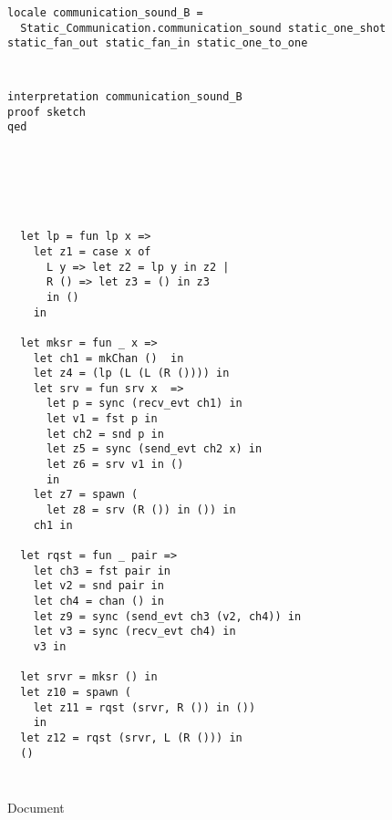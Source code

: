 \begin{lstlisting}[style=codestyle1, escapechar=\%]
locale communication_sound_B =
  Static_Communication.communication_sound static_one_shot static_fan_out static_fan_in static_one_to_one
    \end{lstlisting}

\begin{lstlisting}[style=codestyle1, escapechar=\%]

  \end{lstlisting}


\begin{lstlisting}[style=codestyle1, escapechar=\%]
  \end{lstlisting}


\begin{lstlisting}[style=codestyle1, escapechar=\%]
interpretation communication_sound_B
proof sketch
qed
  \end{lstlisting}


\begin{lstlisting}[style=codestyle1, escapechar=\%]
  \end{lstlisting}


\begin{lstlisting}[style=codestyle1, escapechar=\%]
  \end{lstlisting}


\begin{lstlisting}[style=codestyle1, escapechar=\%]
  \end{lstlisting}


\begin{lstlisting}[style=codestyle1, escapechar=\%]

  \end{lstlisting}


\begin{lstlisting}[style=codestyle1, escapechar=\%]


  let lp = fun lp x => 
    let z1 = case x of 
      L y => let z2 = lp y in z2 |
      R () => let z3 = () in z3
      in ()
    in

  let mksr = fun _ x => 
    let ch1 = mkChan ()  in
    let z4 = (lp (L (L (R ()))) in
    let srv = fun srv x  =>
      let p = sync (recv_evt ch1) in
      let v1 = fst p in
      let ch2 = snd p in 
      let z5 = sync (send_evt ch2 x) in
      let z6 = srv v1 in ()
      in
    let z7 = spawn (
      let z8 = srv (R ()) in ()) in
    ch1 in

  let rqst = fun _ pair =>
    let ch3 = fst pair in
    let v2 = snd pair in
    let ch4 = chan () in
    let z9 = sync (send_evt ch3 (v2, ch4)) in
    let v3 = sync (recv_evt ch4) in
    v3 in

  let srvr = mksr () in
  let z10 = spawn ( 
    let z11 = rqst (srvr, R ()) in ())
    in
  let z12 = rqst (srvr, L (R ())) in
  () 

  \end{lstlisting}


\begin{lstlisting}[style=codestyle1, escapechar=\%]
  \end{lstlisting}


\begin{lstlisting}[style=codestyle1, escapechar=\%]
  \end{lstlisting}





{Document}
